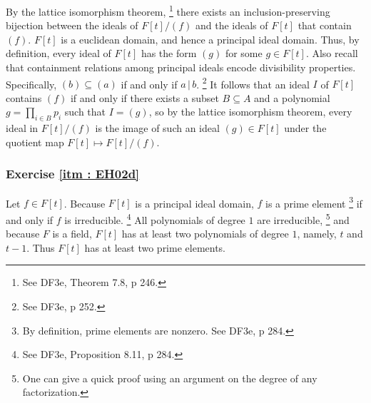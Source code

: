 \documentclass[oneside, english, 11pt]{article}
\newcommand{\divides}{\,|\,}
\begin{document}
By the lattice isomorphism theorem,%
\footnote{See DF3e, Theorem 7.8, p 246.} %
there exists an inclusion-preserving bijection between the ideals of $F[t] / (f)$ and the ideals of $F[t]$ that contain $(f)$. $F[t]$ is a euclidean domain, and hence a principal ideal domain. Thus, by definition, every ideal of $F[t]$ has the form $(g)$ for some $g \in F[t]$. Also recall that containment relations among principal ideals encode divisibility properties. Specifically, $(b) \subseteq (a)$ if and only if $a \divides b$.%
\footnote{See DF3e, p 252.} %
It follows that an ideal $I$ of $F[t]$ contains $(f)$ if and only if there exists a subset $B \subseteq A$ and a polynomial $g = \prod_{i \in B} p_{i}$ such that $I = (g)$, so by the lattice isomorphism theorem, every ideal in $F[t] / (f)$ is the image of such an ideal $(g) \in F[t]$ under the quotient map $F[t] \mapsto F[t] / (f)$.



\subsubsection*{Exercise \ref{itm : EH02d}}

Let $f \in F[t]$. Because $F[t]$ is a principal ideal domain, $f$ is a prime element%
\footnote{By definition, prime elements are nonzero. See DF3e, p 284.} %
if and only if $f$ is irreducible.%
\footnote{See DF3e, Proposition 8.11, p 284.} %
All polynomials of degree $1$ are irreducible, %
\footnote{One can give a quick proof using an argument on the degree of any factorization.} %
and because $F$ is a field, $F[t]$ has at least two polynomials of degree $1$, namely, $t$ and $t - 1$. Thus $F[t]$ has at least two prime elements.
\end{document}
